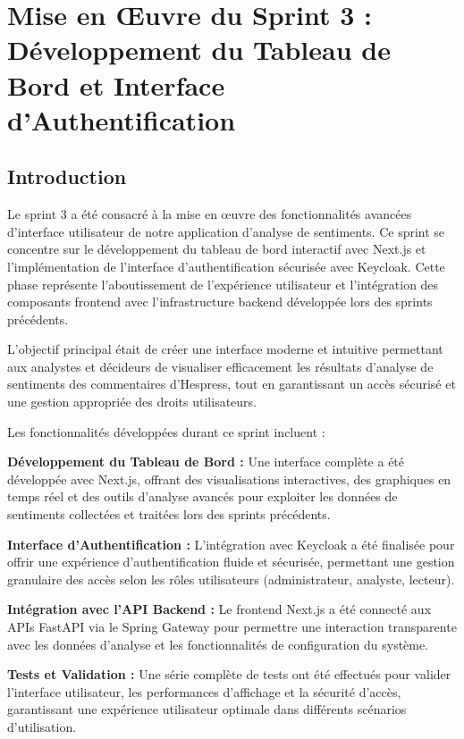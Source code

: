 \chapter{Mise en Œuvre du Sprint 3 : Développement du Tableau de Bord et Interface d'Authentification}

\section{Introduction}

Le sprint 3 a été consacré à la mise en œuvre des fonctionnalités avancées d'interface utilisateur de notre application d'analyse de sentiments. Ce sprint se concentre sur le développement du tableau de bord interactif avec Next.js et l'implémentation de l'interface d'authentification sécurisée avec Keycloak. Cette phase représente l'aboutissement de l'expérience utilisateur et l'intégration des composants frontend avec l'infrastructure backend développée lors des sprints précédents.

L'objectif principal était de créer une interface moderne et intuitive permettant aux analystes et décideurs de visualiser efficacement les résultats d'analyse de sentiments des commentaires d'Hespress, tout en garantissant un accès sécurisé et une gestion appropriée des droits utilisateurs.

Les fonctionnalités développées durant ce sprint incluent :

\textbf{Développement du Tableau de Bord :} Une interface complète a été développée avec Next.js, offrant des visualisations interactives, des graphiques en temps réel et des outils d'analyse avancés pour exploiter les données de sentiments collectées et traitées lors des sprints précédents.

\textbf{Interface d'Authentification :} L'intégration avec Keycloak a été finalisée pour offrir une expérience d'authentification fluide et sécurisée, permettant une gestion granulaire des accès selon les rôles utilisateurs (administrateur, analyste, lecteur).

\textbf{Intégration avec l'API Backend :} Le frontend Next.js a été connecté aux APIs FastAPI via le Spring Gateway pour permettre une interaction transparente avec les données d'analyse et les fonctionnalités de configuration du système.

\textbf{Tests et Validation :} Une série complète de tests ont été effectués pour valider l'interface utilisateur, les performances d'affichage et la sécurité d'accès, garantissant une expérience utilisateur optimale dans différents scénarios d'utilisation.


